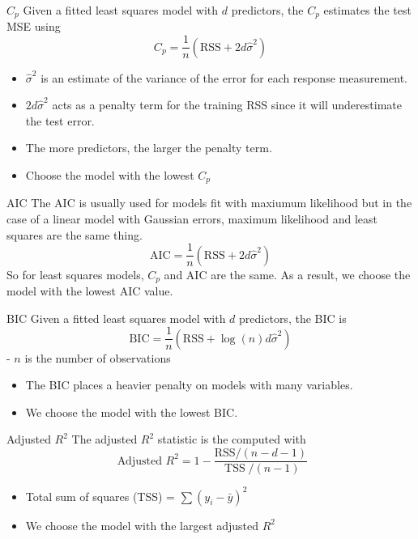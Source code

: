 \documentclass[
  ignorenonframetext,
  aspectratio=169,
]{beamer}
\begin{document}
\begin{frame}{\(C_p\)}
\protect\hypertarget{c_p}{}
Given a fitted least squares model with \(d\) predictors, the \(C_p\)
estimates the test MSE using \[
C_{p}=\frac{1}{n}\left(\mathrm{RSS}+2 d \hat{\sigma}^{2}\right)
\]

\begin{itemize}
\item
  \(\hat{\sigma}^{2}\) is an estimate of the variance of the error for
  each response measurement.
\item
  \(2 d \hat{\sigma}^{2}\) acts as a penalty term for the training RSS
  since it will underestimate the test error.
\item
  The more predictors, the larger the penalty term.
\item
  Choose the model with the lowest \(C_p\)
\end{itemize}
\end{frame}

\begin{frame}{AIC}
\protect\hypertarget{aic}{}
The AIC is usually used for models fit with maxiumum likelihood but in
the case of a linear model with Gaussian errors, maximum likelihood and
least squares are the same thing.
\[\mathrm{AIC}=\frac{1}{n}\left(\mathrm{RSS}+2 d \hat{\sigma}^{2}\right)\]
So for least squares models, \(C_p\) and AIC are the same. As a result,
we choose the model with the lowest AIC value.
\end{frame}

\begin{frame}{BIC}
\protect\hypertarget{bic}{}
Given a fitted least squares model with \(d\) predictors, the BIC is \[
\mathrm{BIC}=\frac{1}{n}\left(\mathrm{RSS}+\log (n) d \hat{\sigma}^{2}\right)
\] - \(n\) is the number of observations

\begin{itemize}
\item
  The BIC places a heavier penalty on models with many variables.
\item
  We choose the model with the lowest BIC.
\end{itemize}
\end{frame}

\begin{frame}{Adjusted \(R^2\)}
\protect\hypertarget{adjusted-r2}{}
The adjusted \(R^2\) statistic is the computed with \[
\text { Adjusted } R^{2}=1-\frac{\mathrm{RSS} /(n-d-1)}{\operatorname{TSS} /(n-1)}\]

\begin{itemize}
\item
  Total sum of squares (TSS) = \(\sum\left(y_{i}-\bar{y}\right)^{2}\)
\item
  We choose the model with the largest adjusted \(R^2\)
\end{itemize}
\end{frame}
\end{document}
